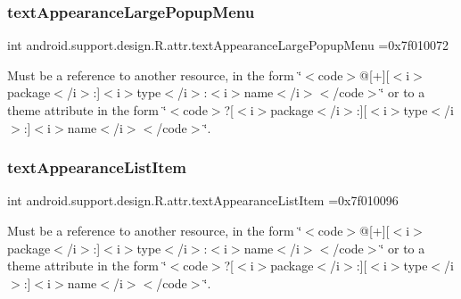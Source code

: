 \subsubsection{\texorpdfstring{text\+Appearance\+Large\+Popup\+Menu}{textAppearanceLargePopupMenu}}
{\footnotesize\ttfamily int android.\+support.\+design.\+R.\+attr.\+text\+Appearance\+Large\+Popup\+Menu =0x7f010072\hspace{0.3cm}{\ttfamily [static]}}

Must be a reference to another resource, in the form \char`\"{}$<$code$>$@\mbox{[}+\mbox{]}\mbox{[}$<$i$>$package$<$/i$>$\+:\mbox{]}$<$i$>$type$<$/i$>$\+:$<$i$>$name$<$/i$>$$<$/code$>$\char`\"{} or to a theme attribute in the form \char`\"{}$<$code$>$?\mbox{[}$<$i$>$package$<$/i$>$\+:\mbox{]}\mbox{[}$<$i$>$type$<$/i$>$\+:\mbox{]}$<$i$>$name$<$/i$>$$<$/code$>$\char`\"{}. \mbox{\label{classandroid_1_1support_1_1design_1_1R_1_1attr_a8003ce7a3a860259e7e2b8dafba8d40f}} 
\subsubsection{\texorpdfstring{text\+Appearance\+List\+Item}{textAppearanceListItem}}
{\footnotesize\ttfamily int android.\+support.\+design.\+R.\+attr.\+text\+Appearance\+List\+Item =0x7f010096\hspace{0.3cm}{\ttfamily [static]}}

Must be a reference to another resource, in the form \char`\"{}$<$code$>$@\mbox{[}+\mbox{]}\mbox{[}$<$i$>$package$<$/i$>$\+:\mbox{]}$<$i$>$type$<$/i$>$\+:$<$i$>$name$<$/i$>$$<$/code$>$\char`\"{} or to a theme attribute in the form \char`\"{}$<$code$>$?\mbox{[}$<$i$>$package$<$/i$>$\+:\mbox{]}\mbox{[}$<$i$>$type$<$/i$>$\+:\mbox{]}$<$i$>$name$<$/i$>$$<$/code$>$\char`\"{}. \mbox{\label{classandroid_1_1support_1_1design_1_1R_1_1attr_ab55f2b07d311017ec8b99a5a710c6a11}} 
